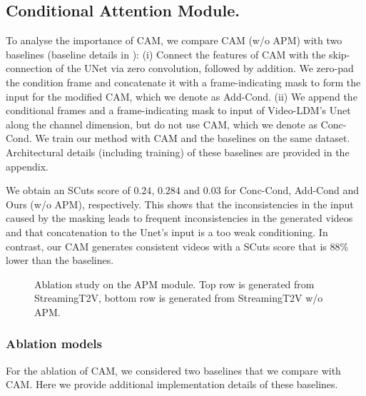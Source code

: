 
\subsection{Conditional Attention Module.}
\label{sec:appendix.ablation_studies.cam}
To analyse the importance of CAM, we compare CAM (w/o APM) with two baselines (baseline details in ): 
(i) Connect the features of CAM with the skip-connection of the UNet via zero convolution, followed by addition. We zero-pad the condition frame and concatenate it with  a frame-indicating mask to form the input for the modified CAM, which we denote as Add-Cond.
(ii) We append the conditional frames and a frame-indicating mask to input of Video-LDM's Unet along the channel dimension, but do not use CAM, which we denote as Conc-Cond.
We train our method with CAM and the baselines on the same dataset. Architectural details (including training) of these baselines are provided in the appendix.

We obtain an SCuts score of $0.24$, $0.284$ and $0.03$ for Conc-Cond, Add-Cond and Ours (w/o APM), respectively. 
This shows that the inconsistencies in the input caused by the masking leads to frequent inconsistencies in the generated videos and that concatenation to the Unet's input is a too weak conditioning. 
In contrast, our CAM generates consistent videos with a SCuts score that is 88\% lower than the baselines. 



\begin{figure}[t]
    \centering
    
    
    \caption{
        Ablation study on the APM module. Top row is generated from StreamingT2V, bottom row is generated from StreamingT2V w/o APM.
    }
    \label{appendix:fix:ablation-apm}
\end{figure}



\subsubsection{Ablation models}
\label{sec:appendix.cam_ablation.ablation_models}
For the ablation of CAM, we considered two baselines that we compare with CAM. Here we provide additional implementation details of these baselines. 

